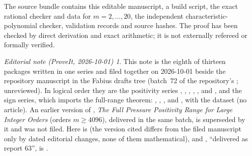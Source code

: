 \documentclass[11pt,a4paper]{article}
\theoremstyle{remark}\newtheorem*{ednote}{Editorial note (ProveIt, 2026-10-01)}
\begin{document}
The source bundle contains this editable manuscript, a build script, the exact rational checker and data for $m=2,\ldots,20$, the independent characteristic-polynomial checker, validation records and source hashes.
The proof has been checked by direct derivation and exact arithmetic; it is not externally refereed or formally verified.

\begin{ednote}
This note is the eighth of thirteen packages written in one series and filed together on 2026-10-01 beside the repository manuscript  in the Fabius drafts tree (batch~72 of the repository's ; unreviewed). In logical order they are the positivity series , , , , ,  and , and the sign series, which imports the full-range theorem: , , ,  and , with the dataset  (no article). An earlier version of , \emph{The Full Pressure Positivity Range for Large Integer Orders} (orders $m\ge4096$), delivered in the same batch, is superseded by it and was not filed.
Here \cite{Repo} is  (the version cited differs from the filed manuscript only by dated editorial changes, none of them mathematical), and \cite{Window}, ``delivered as report
63'', is .
\end{ednote}
\end{document}

